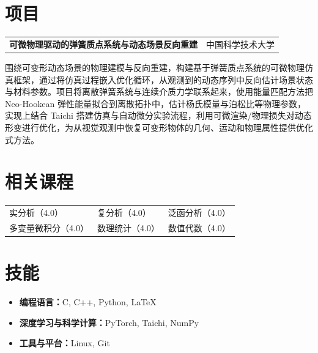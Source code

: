 \documentclass[10.5pt,a4paper]{article}
\makeatletter
\newcommand{\resumeProject}[3]{%
  \begin{tabularx}{\textwidth}{@{}X r@{}}
    \textbf{#1} & #2 \\
  \end{tabularx}
  {\small\textit{#3}}\vspace{0.12em}
}
\newcommand{\resumeParagraph}[1]{%
  {\setlength{\parskip}{0pt}\linespread{1.08}\selectfont #1\par}\vspace{0.10em}
}
\makeatother
\begin{document}
\section{项目}
\resumeProject
{可微物理驱动的弹簧质点系统与动态场景反向重建}{中国科学技术大学}
\resumeParagraph{围绕可变形动态场景的物理建模与反向重建，构建基于弹簧质点系统的可微物理仿真框架，通过将仿真过程嵌入优化循环，从观测到的动态序列中反向估计场景状态与材料参数。项目将离散弹簧系统与连续介质力学联系起来，使用能量匹配方法把 Neo-Hookean 弹性能量拟合到离散拓扑中，估计杨氏模量与泊松比等物理参数，实现上结合 Taichi 搭建仿真与自动微分实验流程，利用可微渲染/物理损失对动态形变进行优化，为从视觉观测中恢复可变形物体的几何、运动和物理属性提供优化式方法。}

\section{相关课程}
\begin{tabularx}{\textwidth}{>{\raggedright\arraybackslash}X >{\raggedright\arraybackslash}X >{\raggedright\arraybackslash}X}
实分析（4.0） & 复分析（4.0） &  泛函分析（4.0） \\
多变量微积分（4.0） & 数理统计（4.0） & 数值代数（4.0）
\end{tabularx}

\section{技能}
\begin{itemize}
    \item \textbf{编程语言：}C, C++, Python, \LaTeX
    \item \textbf{深度学习与科学计算：}PyTorch, Taichi, NumPy
    \item \textbf{工具与平台：}Linux, Git
\end{itemize}
\end{document}
